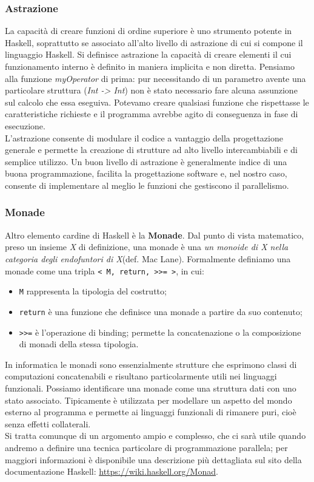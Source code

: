 \subsubsection{Astrazione}
La capacità di creare funzioni di ordine superiore è uno strumento potente in Haskell, soprattutto se associato all'alto livello di astrazione di cui si compone il linguaggio Haskell. Si definisce astrazione la capacità di creare elementi il cui funzionamento interno è definito in maniera implicita e non diretta. Pensiamo alla funzione \textit{myOperator} di prima: pur necessitando di un parametro avente una particolare struttura (\textit{Int -> Int}) non è stato necessario fare alcuna assunzione sul calcolo che essa eseguiva. Potevamo creare qualsiasi funzione che rispettasse le caratteristiche richieste e il programma avrebbe agito di conseguenza in fase di esecuzione.\\
L'astrazione consente di modulare il codice a vantaggio della progettazione generale e permette la creazione di strutture ad alto livello intercambiabili e di semplice utilizzo. Un buon livello di astrazione è generalmente indice di una buona programmazione, facilita la progettazione software e, nel nostro caso, consente di implementare al meglio le funzioni che gestiscono il parallelismo.
\subsubsection{Monade}
Altro elemento cardine di Haskell è la \textbf{Monade}. Dal punto di vista matematico, preso un insieme \textit{X} di definizione, una monade è una \textit{un monoide di X nella categoria degli endofuntori di X}(def. Mac Lane\cite{maclane}). Formalmente definiamo una monade come una tripla \texttt{< M, return, >{}>= >}, in cui:
\begin{itemize}
\item{\texttt{M} rappresenta la tipologia del costrutto;}
\item{\texttt{return} è una funzione che definisce una monade a partire da suo contenuto;}
\item{\texttt{>{}>=} è l'operazione di binding; permette la concatenazione o la composizione di monadi della stessa tipologia.}
\end{itemize}
In informatica le monadi sono essenzialmente strutture che esprimono classi di computazioni concatenabili e risultano particolarmente utili nei linguaggi funzionali. Possiamo identificare una monade come una struttura dati con uno stato  associato. Tipicamente è utilizzata per modellare un aspetto del mondo esterno al programma e   permette   ai   linguaggi funzionali di rimanere puri, cioè senza effetti collaterali.\\
Si tratta comunque di un argomento ampio e complesso, che ci sarà utile quando andremo a definire una tecnica particolare di programmazione parallela; per maggiori informazioni è disponibile una descrizione più dettagliata sul sito della documentazione Haskell: \url{https://wiki.haskell.org/Monad}.
